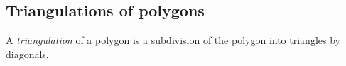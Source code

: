 

\setcounter{section}{4}
\setcounter{subsection}{4}
\setcounter{dfn}{5}

\subsection{Triangulations of polygons}
A \emph{triangulation} of a polygon is a subdivision of the polygon into triangles by diagonals.


